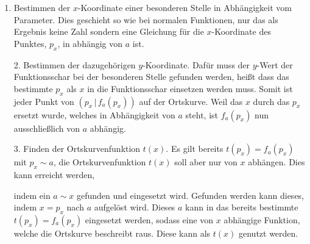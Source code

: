 \documentclass{article}
\begin{document}
\begin{enumerate}
 \item Bestimmen der $x$-Koordinate einer besonderen Stelle in Abhängigkeit vom Parameter. Dies geschieht so wie bei normalen Funktionen, nur das als Ergebnis keine Zahl sondern eine Gleichung für die $x$-Koordinate des Punktes, $p_x$, in abhängig von $a$ ist.
\end{enumerate}   
\begin{minipage}[t]{\dimexpr\textwidth-5cm}
 \begin{enumerate} 
 \item[2.] Bestimmen der dazugehörigen $y$-Koordinate. Dafür muss der $y$-Wert der Funktionsschar bei der besonderen Stelle gefunden werden, heißt dass das bestimmte $p_x$ als $x$ in die Funktionsschar einsetzen werden muss. Somit ist jeder Punkt von $(p_x \,|\, f_a(p_x))$ auf der Ortskurve. Weil das $x$ durch das $p_x$ ersetzt wurde, welches in Abhängigkeit von $a$ steht, ist $f_a(p_x)$ nun ausschließlich von $a$ abhängig.
 \item[3.] Finden der Ortskurvenfunktion $t(x)$. Es gilt bereits $t(p_x) = f_a(p_x)$ mit $p_x \sim a$, die Ortskurvenfunktion $t(x)$ soll aber nur von $x$ abhängen. Dies kann erreicht werden,
 \end{enumerate}
 \end{minipage}
\hfill
\begin{minipage}[t]{5cm}
  \centering
\end{minipage}
\begin{enumerate}
 \vspace{-0.5em} 
 \item[] indem ein $a \sim x$ gefunden und eingesetzt wird. Gefunden werden kann dieses, indem $x = p_x$ nach $a$ aufgelöst wird. Dieses $a$ kann in das bereits bestimmte $t(p_x) = f_a(p_x)$ eingesetzt werden, sodass eine von $x$ abhängige Funktion, welche die Ortskurve beschreibt raus. Diese kann als $t(x)$ genutzt werden.
\end{enumerate}
 
 
\end{document}
